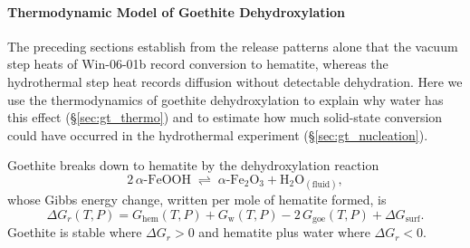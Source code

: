 

\paragraph{Thermodynamic Model of Goethite Dehydroxylation}\label{sec:gt_thermo_methods}

The preceding sections establish from the release patterns alone that the vacuum step heats of
Win-06-01b record conversion to hematite, whereas the hydrothermal step heat records diffusion
without detectable dehydration. Here we use the thermodynamics of goethite dehydroxylation to
explain why water has this effect (\S\ref{sec:gt_thermo}) and to estimate how much solid-state
conversion could have occurred in the hydrothermal experiment (\S\ref{sec:gt_nucleation}).

Goethite breaks down to hematite by the dehydroxylation reaction
\begin{equation}
  2\,\alpha\text{-FeOOH} \;\rightleftharpoons\; \alpha\text{-Fe}_2\text{O}_3 + \text{H}_2\text{O}_{(\text{fluid})},
  \label{eq:gt_rxn}
\end{equation}
whose Gibbs energy change, written per mole of hematite formed, is
\begin{equation}
  \Delta G_r(T,P) = G_{\mathrm{hem}}(T,P) + G_{\mathrm{w}}(T,P) - 2\,G_{\mathrm{goe}}(T,P) + \Delta G_{\mathrm{surf}} .
  \label{eq:gt_dGr}
\end{equation}
Goethite is stable where $\Delta G_r>0$ and hematite plus water where $\Delta G_r<0$.

